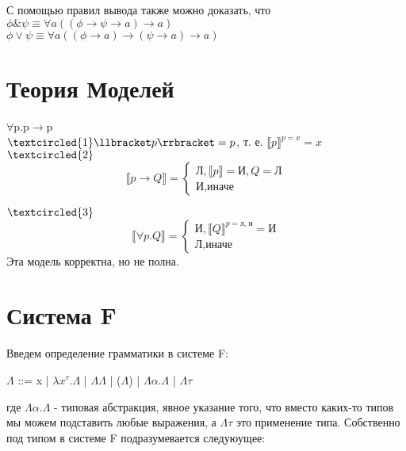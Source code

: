 \documentclass[10pt,a4paper]{article}
\begin{document}
   	\large С помощью правил вывода также можно доказать, что \\
   	$\phi\&\psi\equiv\forall a((\phi\rightarrow\psi\rightarrow a)\rightarrow a)$\\
   	$\phi\vee\psi\equiv\forall a((\phi\rightarrow a)\rightarrow(\psi\rightarrow a)\rightarrow a)$
   
   	\section{Теория Моделей}
   	\textsl{}
   	\large$\forall$p.p$\rightarrow$p\\
   	\large$\textcircled{1} \\
   	  \llbracket p\rrbracket=p$, т. е. $\llbracket p\rrbracket^{p = x} = x$ \\


   	\large\noindent $\textcircled{2}$
   	\begin{equation*}
   		\llbracket p\rightarrow Q\rrbracket = 
   		\begin{cases}
   			\text{Л}, \llbracket p\rrbracket = \text{И}, Q = \text{Л} \\
   			\text{И}, \text{иначе}
   		\end{cases}
   	\end{equation*}
   	
   	\large \noindent $\textcircled{3}$
 	   	\begin{equation*}
 			\llbracket\forall p.Q\rrbracket = 
 			\begin{cases}
 				\text{И}, \llbracket Q\rrbracket^{p=\text{л, и}} = \text{И} \\
 				\text{Л}, \text{иначе}
 			\end{cases}
 		\end{equation*}  
 	Эта модель корректна, но не полна.
 	
	\section{Система F}
	\large Введем определение грамматики в системе F:
	\begin{center}
		\large $\Lambda$ ::= x | $\lambda x^{\tau}.\Lambda$ | $\Lambda\Lambda$ | ($\Lambda$) | $\Lambda\alpha.\Lambda$ | $\Lambda\tau$ 
	\end{center}
	
	где $\Lambda\alpha.\Lambda$ - типовая абстракция, явное указание того, что вместо каких-то типов мы можем подставить любые выражения, а $\Lambda\tau$ это применение типа.
	Собственно под типом в системе F подразумевается следуюущее:
	
\end{document}
